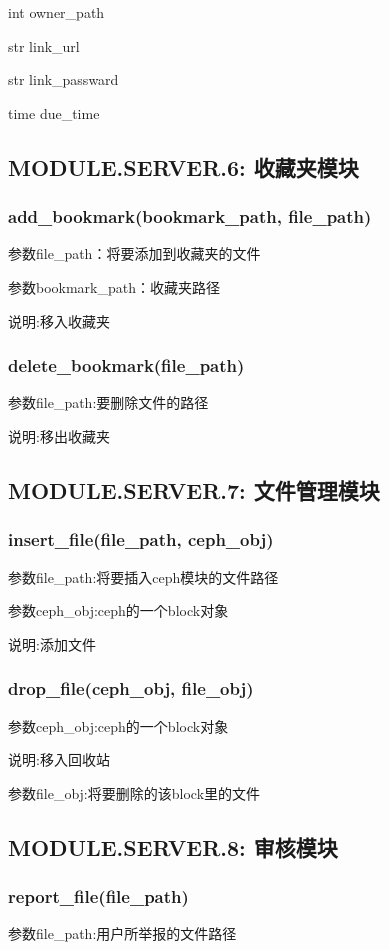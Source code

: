     int owner\_path

    str link\_url

    str link\_passward

    time due\_time

\subsection{MODULE.SERVER.6: 收藏夹模块}

\subsubsection{add\_bookmark(bookmark\_path, file\_path)}
参数file\_path：将要添加到收藏夹的文件

参数bookmark\_path：收藏夹路径

说明:移入收藏夹
\subsubsection{delete\_bookmark(file\_path)}
参数file\_path:要删除文件的路径
 
说明:移出收藏夹
\subsection{MODULE.SERVER.7: 文件管理模块}

\subsubsection{insert\_file(file\_path, ceph\_obj)}
参数file\_path:将要插入ceph模块的文件路径

参数ceph\_obj:ceph的一个block对象

说明:添加文件

\subsubsection{drop\_file(ceph\_obj, file\_obj)}
参数ceph\_obj:ceph的一个block对象

说明:移入回收站

参数file\_obj:将要删除的该block里的文件
\subsection{MODULE.SERVER.8: 审核模块}
\subsubsection{report\_file(file\_path)}
参数file\_path:用户所举报的文件路径

